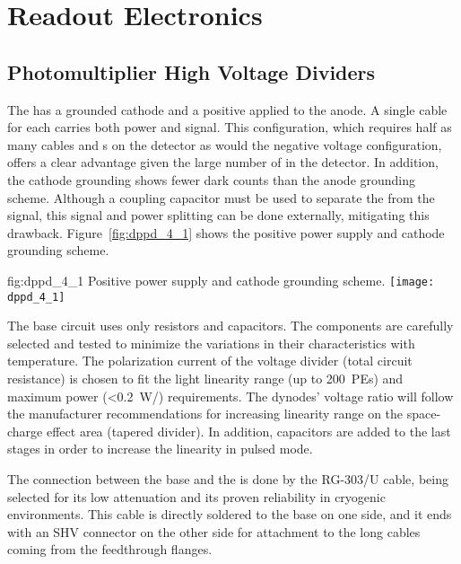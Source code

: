 \section{Readout Electronics}
\label{sec:dp-pds-electronics}

\subsection{Photomultiplier High Voltage Dividers}
\label{sec:fddp-pd-4.1}

The  has a grounded cathode and a positive  applied to the anode. A single cable for each  carries both power and signal. This configuration, which requires half as many cables and \fdth{}s on the detector as would the negative voltage configuration, offers a clear advantage given the large number of  in the detector. In addition, the cathode grounding shows fewer dark counts than the anode grounding scheme. Although a coupling capacitor must be used to separate the  from the  signal, this signal and power splitting can be done externally, mitigating this drawback.  Figure~\ref{fig:dppd_4_1} shows the positive power supply and cathode grounding scheme.

\begin{dunefigure}{fig:dppd_4_1}
{Positive power supply and cathode grounding scheme.}
\texttt{[image: dppd\_4\_1]}
\end{dunefigure}

The  base circuit uses only resistors and capacitors. The components are carefully selected and tested to minimize the variations in their characteristics with temperature. The polarization current of the voltage divider (total circuit resistance) is chosen to fit the  light linearity range (up to \SI{200}{PEs}) and maximum power (\SI{<0.2}{W/}) requirements. The dynodes' voltage ratio will follow the manufacturer recommendations for increasing linearity range on the space-charge effect area (tapered divider). In addition, capacitors are added to the last stages in order to increase the  linearity in pulsed mode.

The connection between the  base and the \fdth is done by the RG-303/U cable, being selected for its low attenuation and its proven reliability in cryogenic environments. This cable is directly soldered to the  base on one side, and it ends with an SHV connector on the other side for attachment to the long  cables coming from the feedthrough flanges. 

